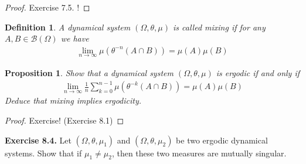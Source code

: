 \documentclass[11pt,a4paper, final]{article}
\newtheorem{prop}{Proposition}[section]
\newtheorem{defn}{Definition}[section]
\theoremstyle{definition}
\begin{document}
\begin{proof}
Exercise 7.5. !
\end{proof}
\begin{defn} A dynamical system $( \Omega, \theta, \mu)$ is called mixing if for any $A,B \in \mathcal{B}( \Omega)$ we have
\begin{align*}
\lim_{n \to \infty} \mu(\theta^{-n}( A \cap B)) = \mu(A) \mu(B)
\end{align*}
\end{defn}
\begin{prop} Show that a dynamical system $( \Omega, \theta, \mu)$ is ergodic if and only if 
\begin{align*}
\lim_{n \to \infty} \frac{1}{n} \sum_{k=0}^{n-1} \mu( \theta^{-k}( A \cap B)) = \mu(A) \mu(B)
\end{align*}
Deduce that mixing implies ergodicity. 
\end{prop}
\begin{proof}
Exercise! (Exercise 8.1)
\end{proof}
\noindent \textbf{Exercise 8.4.} Let $( \Omega, \theta, \mu_1)$ and $( \Omega, \theta, \mu_2)$ be two ergodic dynamical systems. Show that if $\mu_1 \neq \mu_2$, then these two measures are mutually singular. 
\newpage
\end{document}

